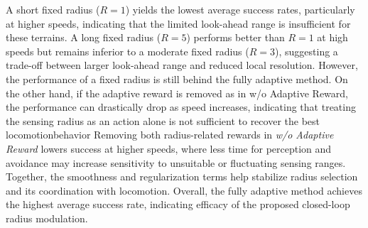 \documentclass[letterpaper, 10 pt, conference]{ieeeconf/ieeeconf}
\providecommand{\DIFadd}[1]{{\protect\color{blue} \sf #1}} %
\providecommand{\DIFdel}[1]{{\protect\color{red} \scriptsize #1}} %
\providecommand{\DIFaddbegin}{} %
\providecommand{\DIFaddend}{} %
\providecommand{\DIFdelbegin}{} %
\providecommand{\DIFdelend}{} %
\begin{document}
A short fixed radius ($R=1$) yields the lowest average success rates, particularly at higher speeds, indicating that the limited look-ahead range is insufficient for these terrains. 
A long fixed radius ($R=5$) performs better than $R=1$ at high speeds but remains inferior to a moderate fixed radius ($R=3$), suggesting a trade-off between larger look-ahead range and reduced local resolution. However, the performance of a fixed radius is still behind the fully adaptive method. \DIFdelbegin \DIFdel{On the other hand, if the adaptive reward is removed as in w/o Adaptive Reward, the performance can drastically drop as speed increases, indicating that treating the sensing radius as an action alone is not sufficient to recover the best locomotionbehavior}\DIFdelend \DIFaddbegin \DIFadd{Removing both radius-related rewards in \textit{w/o Adaptive Reward} lowers success at higher speeds, where less time for perception and avoidance may increase sensitivity to unsuitable or fluctuating sensing ranges. Together, the smoothness and regularization terms help stabilize radius selection and its coordination with locomotion}\DIFaddend .
Overall, the fully adaptive method achieves the highest average success rate, indicating efficacy of the proposed closed-loop radius modulation.
\end{document}
